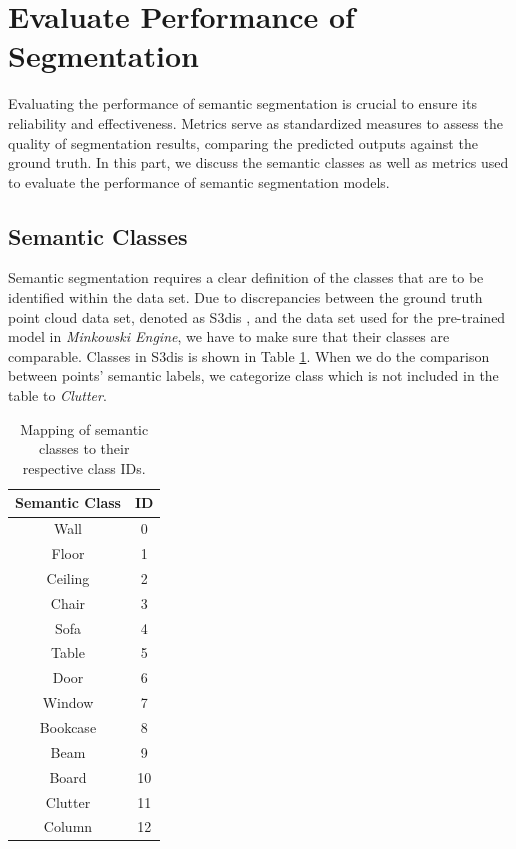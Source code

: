 \documentclass[11pt, a4paper,oneside,chapterprefix=false]{scrbook}
\begin{document}
\section{Evaluate Performance of Segmentation} \label{evaluate performance of segmentation}

Evaluating the performance of semantic segmentation is crucial to ensure its reliability and effectiveness. Metrics serve as standardized measures to assess the quality of segmentation results, comparing the predicted outputs against the ground truth. In this part, we discuss the semantic classes as well as metrics used to evaluate the performance of semantic segmentation models.

\subsection{Semantic Classes}

Semantic segmentation requires a clear definition of the classes that are to be identified within the data set. Due to discrepancies between the ground truth point cloud data set, denoted as S3dis \cite{Iro:16}, and the data set used for the pre-trained model in \emph{Minkowski Engine}, we have to make sure that their classes are comparable. Classes in S3dis is shown in Table \ref{tab:semantic_classes}. When we do the comparison between points' semantic labels, we categorize 
class which is not included in the table to \emph{Clutter}.

\begin{table}[H]
    \centering
    \begin{tabular}{|c|c|}
        \hline
        \textbf{Semantic Class} & \textbf{ID} \\
        \hline
        Wall & 0 \\
        Floor & 1 \\
        Ceiling & 2 \\
        Chair & 3 \\
        Sofa & 4 \\
        Table & 5 \\
        Door & 6 \\
        Window & 7 \\
        Bookcase & 8 \\
        Beam & 9 \\
        Board & 10 \\
        Clutter & 11 \\
        Column & 12 \\
        \hline
    \end{tabular}
    \caption{Mapping of semantic classes to their respective class IDs.}
    \label{tab:semantic_classes}
\end{table}
\end{document}
